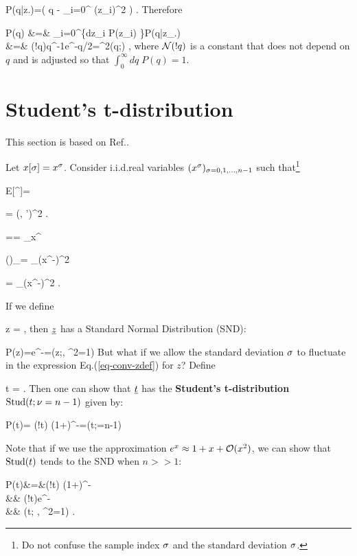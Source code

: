 \beq
\color{blue}
P(q|z.)=\delta(
q - \sum_{i=0}^{} (z_i)^2
)
\;.
\eeq
Therefore

\beqa
P(q) &=& \prod_{i=0}^{}\left\{\int dz_i
\;P(z_i)
\right\}P(q|z_.)
\\
&=&
\caln(!q)q^{-1}e^{-q/2}=\chi^2(q;\nu)
\;,
\eeqa
where ${\cal N}(!q)$ is a constant that does not depend
on $q$ and is adjusted so that $\int_0^\infty dq\;P(q)=1$.

\section{Student's t-distribution}
This section
is based on Ref.\cite{wiki-stud}.

Let $x[\sigma]=x^\sigma$.
Consider i.i.d.real  variables
$(x^\sigma)_{\sigma=0,1, \ldots, n-1}$
such that\footnote{Do not confuse the sample
index $\sigma$ and the standard deviation
$\sigma$.}

\beq
E[\rvx^\s]=\mu
\eeq

\beq
{}=
\delta(\s, \s')\s^2
\;.
\eeq

\beq
\HAT{\mu}==
\sum_\s x^\s
\;
\eeq

\beq
(\hatvar)_\infty=
\sum_\s (x^\s-\mu)^2
\eeq

\beq
\hatvar=
\sum_\s (x^\s-\HAT{\mu})^2
\;.
\eeq

If we define

\beq
z =
\label{eq-conv-zdef}
\;,
\eeq
then $\rvz$ has a Standard Normal
 Distribution (SND):

\beq
P(z)=e^{-\;}=\caln(z;, \s^2=1)
\eeq
But what if we allow the standard deviation $\sigma$
to fluctuate in the expression
Eq.(\ref{eq-conv-zdef}) for $z$?
Define

\beq
t =
\;.
\label{eq-conv-tdef}
\eeq
Then one can show that
$\rvt$
has the {\bf Student's t-distribution}
${\rm Stud}(t;\nu=n-1)$
given by:

\beq
P(t)=
\caln(!t)
(1+)^{-\;}=(t;\nu=n-1)
\eeq

Note that if we use the approximation
$e^x\approx 1 +x +{\cal O}(x^2)$,
we can show that ${\rm Stud}(t)$
tends to the SND
when $n>>1$:

\beqa
P(t)&=&\caln(!t)
(1+)^{-\;}
\\
&\approx&
\caln(!t)e^{-\;}
\\
&\approx&
\caln(t; , \s^2=1)
\;.
\eeqa

